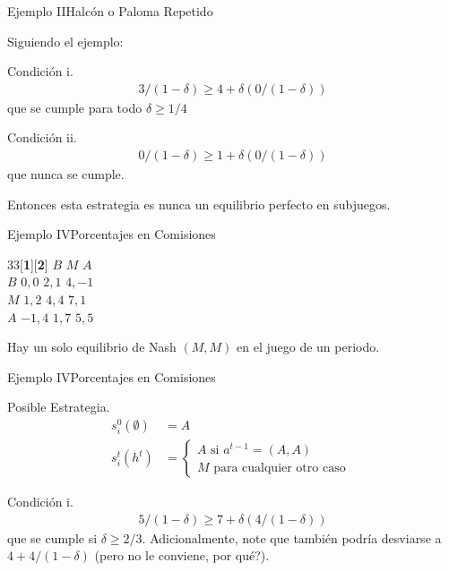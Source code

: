 \documentclass[notes, 11pt]{beamer} %
\newenvironment{wideitemize}{\itemize\addtolength{\itemsep}{10pt}}{\enditemize}
\begin{document}
\begin{frame}{Ejemplo II}{Halc\'on o Paloma Repetido}
	\begin{wideitemize}
		\item<1-> Siguiendo el ejemplo: 
			\begin{wideitemize}
				\item<2->[--] Condici\'on i. 
				\begin{align*}
					3/(1-\delta) \geq 4 + \delta (0/(1-\delta))
				\end{align*} que se cumple para todo $\delta \geq 1/4$
				\item<3->[--] Condici\'on ii.
				\begin{align*}
					0/(1-\delta) \geq 1 + \delta (0/(1-\delta))
				\end{align*} que nunca se cumple.
				\item<4-> Entonces esta estrategia es nunca un equilibrio perfecto en subjuegos.
			\end{wideitemize}
	\end{wideitemize}
\end{frame}

\begin{frame}{Ejemplo IV}{Porcentajes en Comisiones}
	\begin{center}
	\begin{game}{3}{3}[\textbf{1}][\textbf{2}]
                  \>$B$         \>$M$    \>$A$    \\
        $B$       \>$0,0$       \>$2,1$  \>$4,-1$  \\
        $M$       \>$1,2$       \>$4,4$  \>$7,1$  \\
        $A$       \>$-1,4$       \>$1,7$  \>$5,5$  
 	\end{game}
 	\end{center}

\begin{wideitemize}
	\item<1-> Hay un solo equilibrio de Nash $(M,M)$ en el juego de un periodo.
\end{wideitemize}
\end{frame}

\begin{frame}{Ejemplo IV}{Porcentajes en Comisiones}
\begin{wideitemize}
	\item<1-> Posible Estrategia.
	\begin{align*}
		s_{i}^{0}(\emptyset) &= A \\
		s_{i}^{t}(h^{t}) & = \begin{cases}
		 A \text{ si } a^{t-1} = (A,A) \\
		 M \text{ para cualquier otro caso }
		\end{cases}
	\end{align*}
	\item<2-> Condici\'on i.
		\begin{align*}
			5/(1-\delta) \geq 7 + \delta(4/(1-\delta))
		\end{align*} que se cumple si $\delta \geq 2/3$. Adicionalmente, note que tambi\'en podr\'ia desviarse a $4 + 4/(1-\delta)$ (pero no le conviene, por qu\'e?). 
\end{wideitemize}
\end{frame}
\end{document}
